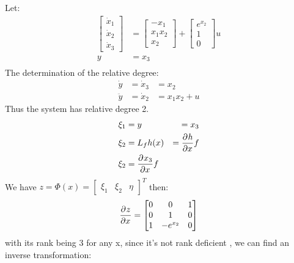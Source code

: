 \ex{}
{
    Let:
    \begin{equation}
        \begin{aligned}
        \begin{bmatrix}
            \dot{x}_1  \\
            \dot{x}_2 \\
            \dot{x}_3
            \end{bmatrix} &= \begin{bmatrix}
            -x_1 \\
            x_1x_2\\
            x_2
        \end{bmatrix}
        + \begin{bmatrix}
            e^{x_2}\\
            1\\
            0
        \end{bmatrix} u\\
        y &= x_3\\
    \end{aligned}
    \end{equation}
    The determination of the relative degree:
    \begin{equation}
        \begin{aligned}
            \dot{y} &= \dot{x}_3 &= x_2\\
            \ddot{y} &= \dot{x}_2 &= x_1x_2+u
        \end{aligned}
    \end{equation}
Thus the system has relative degree 2.
\begin{equation}
    \begin{aligned}
        \xi_1 &= y &= x_3\\
        \xi_2 &= L_f h(x) &= \frac{\partial^{}h}{\partial x^{}}f\\
        \xi_2 &= \frac{\partial^{}x_3}{\partial x^{}}f
    \end{aligned}
\end{equation}
}
We have $z = \Phi(x) = \begin{bmatrix}
    \xi_1 & \xi_2 & \eta 
\end{bmatrix}^{T}$
then:
\begin{equation}
    \frac{\partial^{}z}{\partial x^{}} = \begin{bmatrix}
        0 & 0 & 1 \\
        0 & 1 & 0 \\
        1 &-e^{x_2} &0
    \end{bmatrix}
\end{equation}
with its rank being 3 for any x, since it's not rank deficient , we can find an inverse transformation:

